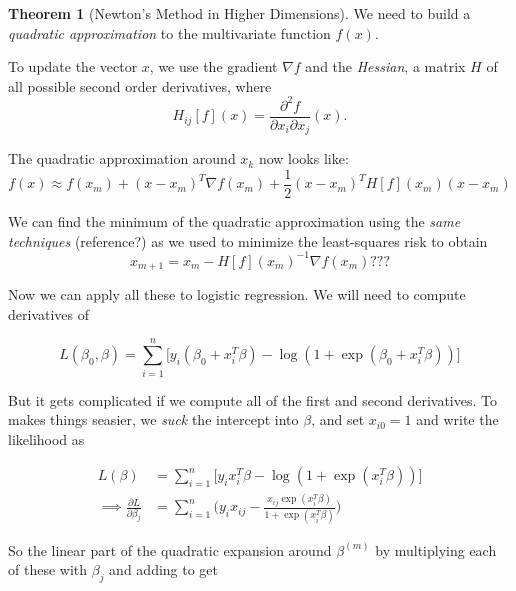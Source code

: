 \documentclass[11pt]{article}
\theoremstyle{definition}
\newtheorem{theorem}{Theorem}[section]
\numberwithin{equation}{section}
\begin{document}
\begin{theorem}[Newton's Method in Higher Dimensions]
  We need to build a \textit{quadratic approximation} to the multivariate function $f(x)$.

  To update the vector $x$, we use the gradient $\nabla f$ and the \textit{Hessian}, a matrix $H$ of all possible second order derivatives, where
  \begin{equation}
    H_{ij}[f](x) = \frac{\partial^2f}{\partial x_i\partial x_j}(x).
  \end{equation}

  The quadratic approximation around $x_k$ now looks like:
  \begin{equation}
    f(x)\approx f(x_m) + (x - x_m)^T\nabla f(x_m) + \frac{1}{2}(x - x_m)^TH[f](x_m)(x - x_m)
  \end{equation}

  We can find the minimum of the quadratic approximation using the \textit{same techniques} (reference?) as we used to minimize the least-squares risk to obtain
  \begin{equation}
    x_{m+1} = x_m - H[f](x_m)^{-1}\nabla f(x_m) ???
  \end{equation}

\end{theorem}

Now we can apply all these to logistic regression. We will need to compute derivatives of

\begin{equation}
  L(\beta_0, \beta) = \sum^n_{i=1}\bigg[ y_i(\beta_0 + x_i^T\beta) - \log(1 + \exp(\beta_0 + x_i^T\beta)) \bigg]
\end{equation}

But it gets complicated if we compute all of the first and second derivatives. To makes things seasier, we \textit{suck} the intercept into $\beta$, and set $x_{i0}=1$ and write the likelihood as

\begin{align}
  L(\beta)&=\sum^n_{i=1}\bigg[ y_ix_i^T\beta-\log(1 + \exp(x_i^T\beta)) \bigg]\\
  \implies\frac{\partial L}{\partial\beta_j} &=\sum^n_{i=1}\Bigg( y_ix_{ij} - \frac{x_{ij}\exp(x_i^T\beta)}{1+\exp(x_i^T\beta)} \Bigg)\label{dldbetaj}
\end{align}

So the linear part of the quadratic expansion around $\beta^{(m)}$ by multiplying each of these with $\beta_j$ and adding to get
\end{document}

